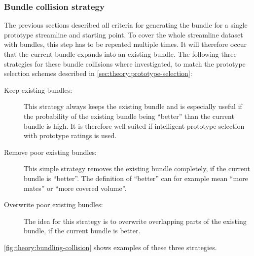 

\subsubsection{Bundle collision strategy}
\label{sec:theory:bundle-collision}

%
The previous sections described all criteria for generating the bundle for a single prototype streamline and starting point. To cover the whole streamline dataset with bundles, this step has to be repeated multiple times. It will therefore occur that the current bundle expands into an existing bundle. The following three strategies for these bundle collisions where investigated, to match the prototype selection schemes described in \autoref{sec:theory:prototype-selection}:
%
\begin{description}
%
  \item[Keep existing bundles:] This strategy always keeps the existing bundle and is especially useful if the probability of the existing bundle being ``better'' than the current bundle is high. It is therefore well suited if intelligent prototype selection with prototype ratings is used.
%
  \item[Remove poor existing bundles:] This simple strategy removes the existing bundle completely, if the current bundle is ``better''. The definition of ``better'' can for example mean ``more mates'' or ``more covered volume''.
%
  \item[Overwrite poor existing bundles:] The idea for this strategy is to overwrite overlapping parts of the existing bundle, if the current bundle is better.
%
\end{description}

\autoref{fig:theory:bundling-collision} shows examples of these three strategies. %

